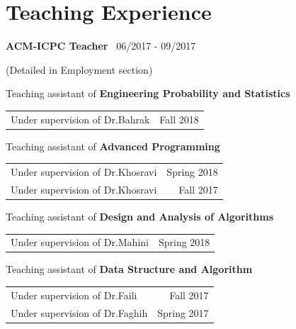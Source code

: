 \documentclass[letterpaper]{article}
\renewenvironment{itemize}{
  \begin{list}{}{
    \setlength{\leftmargin}{1.5em}
  }
}{
  \end{list}
}
\begin{document}
\section*{Teaching Experience}
\begin{itemize}
    \item \hspace*{10pt} \textbf{ACM-ICPC Teacher} {\ \footnotesize 06/2017 - 09/2017}\\
        \hspace*{30pt}
        \begin{small}
            (Detailed in Employment section)
        \end{small}
    \item \hspace*{10pt} Teaching assistant of \textbf{Engineering Probability and Statistics}\\
        \hspace*{30pt}
        \begin{tabular}{l r}
            Under supervision of Dr.Bahrak\hspace*{230pt} & {Fall 2018} \\
        \end{tabular}
    \item \hspace*{10pt} Teaching assistant of \textbf{Advanced Programming}\\
        \hspace*{30pt}
        \begin{tabular}{l r}
            Under supervision of Dr.Khosravi\hspace*{210pt} & {Spring 2018} \\
            Under supervision of Dr.Khosravi\hspace*{210pt} & {Fall 2017} \\
        \end{tabular}
    \item \hspace*{10pt} Teaching assistant of \textbf{Design and Analysis of Algorithms}\\
        \hspace*{30pt}
        \begin{tabular}{l r}
            Under supervision of Dr.Mahini\hspace*{220pt} & {Spring 2018} \\
        \end{tabular}
    \item \hspace*{10pt} Teaching assistant of \textbf{Data Structure and Algorithm}\\
        \hspace*{30pt}
        \begin{tabular}{l r}
            Under supervision of Dr.Faili\hspace*{220pt} & {Fall 2017} \\
            Under supervision of Dr.Faghih\hspace*{220pt} & {Spring 2017} \\
        \end{tabular}
\end{itemize}
\end{document}

